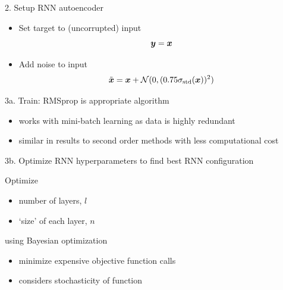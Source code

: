 \documentclass{beamer}
\begin{document}
    \begin{frame}{2. Setup RNN autoencoder}

      \begin{itemize}
      \item Set target to (uncorrupted) input
        \begin{equation*}\boldsymbol{y}=\boldsymbol{x}\end{equation*}
      \item Add noise to input
        \begin{equation*}
          \tilde{\boldsymbol{x}} = \boldsymbol{x}
          + \mathcal{N}(0,(0.75\sigma_{\mathrm{std}}(\boldsymbol{x}))^2)
        \end{equation*}
      \end{itemize}

    \end{frame}


    \begin{frame}{3a. Train: RMSprop is appropriate algorithm}
      
      \begin{itemize}
      \item works with mini-batch learning as data is highly redundant
      \item similar in results to second order methods with less computational cost
      \end{itemize}

    \end{frame}


    \begin{frame}{3b. Optimize RNN hyperparameters to find best RNN configuration}
      
      Optimize
      \begin{itemize}
        \item number of layers, $l$
        \item `size' of each layer, $n$
      \end{itemize}

      using Bayesian optimization
      \begin{itemize}
      \item minimize expensive objective function calls
      \item considers stochasticity of function
      \end{itemize}

    \end{frame}
\end{document}
